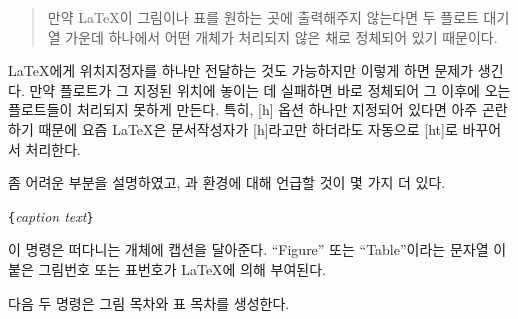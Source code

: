 \begin{quote}
  만약 \LaTeX 이 그림이나 표를 원하는 곳에 출력해주지 않는다면
  두 플로트 대기열 가운데 하나에서 어떤 개체가 처리되지 않은 채로 정체되어 있기 때문이다.
\end{quote}


\LaTeX 에게 위치지정자를 하나만 전달하는 것도 가능하지만 이렇게 하면 문제가 생긴다.
만약 플로트가 그 지정된 위치에 놓이는 데 실패하면 바로 정체되어 그 이후에 오는 플로트들이
처리되지 못하게 만든다.
특히, [h] 옵션 하나만 지정되어 있다면 아주 곤란하기 때문에 요즘 \LaTeX 은 문서작성자가 
[h]라고만 하더라도 자동으로 [ht]로 바꾸어서 처리한다.

\bigskip
\noindent 좀 어려운 부분을 설명하였고, 과  환경에 대해 
언급할 것이 몇 가지 더 있다.

\begin{lscommand}
\verb|{|\emph{caption text}\verb|}|
\end{lscommand}
\noindent 이 명령은 떠다니는 개체에 캡션을 달아준다. ``Figure'' 또는 ``Table''이라는 
문자열%
이 붙은 그림번호 또는 표번호가 \LaTeX 에 의해 부여된다.

\bigskip

다음 두 명령은 그림 목차와 표 목차를 생성한다.

\begin{lscommand}
 
\end{lscommand}

